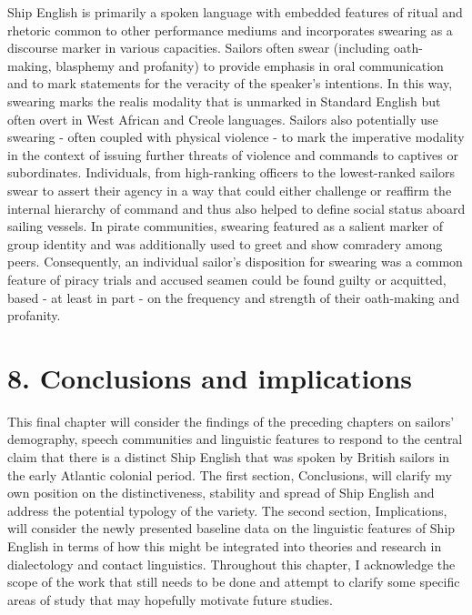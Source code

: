 Ship English is primarily a spoken language with embedded features of ritual and rhetoric common to other performance mediums and incorporates swearing as a discourse marker in various capacities. Sailors often swear (including oath-making, blasphemy and profanity) to provide emphasis in oral communication and to mark statements for the veracity of the speaker’s intentions. In this way, swearing marks the realis modality that is unmarked in Standard English but often overt in West African and Creole languages. Sailors also potentially use swearing - often coupled with physical violence - to mark the imperative modality in the context of issuing further threats of violence and commands to captives or subordinates. Individuals, from {high-ranking officers to the lowest-ranked sailors} swear to assert their agency in a way that could either challenge or reaffirm the internal hierarchy of command and thus also helped to define social status aboard sailing vessels. In pirate communities, swearing featured as a salient marker of group identity and was additionally used to greet and show comradery among peers.  Consequently, an individual sailor’s disposition for swearing was a common feature of piracy trials and accused seamen could be found guilty or acquitted, based - at least in part - on the frequency and strength of their oath-making and profanity. 

\chapter{\textbf{8.} \textbf{Conclusions} \textbf{and} \textbf{implications}}

This final chapter will consider the findings of the preceding chapters on sailors’ demography, speech communities and linguistic features to respond to the central claim that there is a distinct Ship English that was spoken by British sailors in the early Atlantic colonial period. The first section, Conclusions, will clarify my own position on the distinctiveness, stability and spread of Ship English and address the potential typology of the variety. The second section, Implications, will consider the newly presented baseline data on the linguistic features of Ship English in terms of how this might be integrated into theories and research in dialectology and contact linguistics. Throughout this chapter, I acknowledge the scope of the work that still needs to be done and attempt to clarify some specific areas of study that may hopefully motivate future studies.

